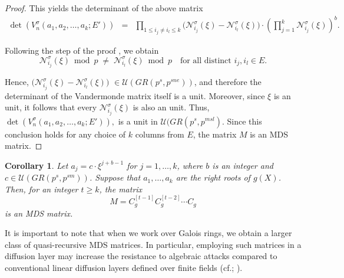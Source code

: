 \documentclass[11pt]{article}
\newtheorem{corollary}{Corollary}
\begin{document}
\begin{proof}
		This yields the determinant of the above matrix
        \begin{eqnarray}
            \det (V^\sigma_n(a_1,a_2,\dots,a_k;E') )&=& \prod_{1\leq i_j\neq i_l\leq k}\Big(\mathcal{N}^\sigma_{i_j}(\xi)-\mathcal{N}^\sigma_{i_l}(\xi)\Big)	\cdot \left( \prod_{j=1}^{k} \mathcal{N}^\sigma_{i_j}(\xi) \right)^{b}.
        \end{eqnarray}
        
	
	
 Following the step of the proof  \cite[Theorem~4]{Bhaintwal2012Skew}, we obtain
	\[
	\mathcal{N}^\sigma_{i_j}(\xi) \bmod p \;\neq\; \mathcal{N}^\sigma_{i_l}(\xi) \bmod p \quad \text{for all distinct } i_j,i_l \in E.
	\]
    
	Hence, $\Big(\mathcal{N}^\sigma_{i_j}(\xi)-\mathcal{N}^\sigma_{i_l}(\xi)\Big)$   $\in \mathcal{U}(GR(p^s,p^{sne}))$, and therefore the determinant of the Vandermonde matrix itself is a unit. Moreover, since $\xi$ is an unit, it follows that every $\mathcal{N}^\sigma_{i_j}(\xi)$ is also an unit. Thus, 
	$
	\det\!\left(V^\sigma_n(a_1,a_2,\dots,a_k;E') \right),
	$
	is a unit in $\mathcal{U}(GR(p^s,p^{msl})$. Since this conclusion holds for any choice of $k$ columns from $E$, the matrix $M$ is an MDS matrix.
\end{proof}

\begin{corollary}Let $a_j = c\cdot\xi^{j + b - 1}$ for $j = 1, \dots, k$, where $b$ is an integer and $c\in \mathcal{U}(GR(p^s,p^{sm}))$. 
Suppose that $a_1, \dots, a_k$ are the right roots of $g(X)$. Then, for an integer 
$t \geq k$, the matrix 
\[
M = C_g^{[t-1]} C_g^{[t-2]} \cdots C_g
\] 
is an \textup{MDS} matrix.  \end{corollary}

It is important to note that when we work over Galois rings, we obtain a larger class of quasi-recursive MDS matrices. In particular, employing such matrices in a diffusion layer may increase the resistance to algebraic attacks compared to conventional linear diffusion layers defined over finite fields (cf.; \cite{Kesarwani2021}). 
\end{document}
